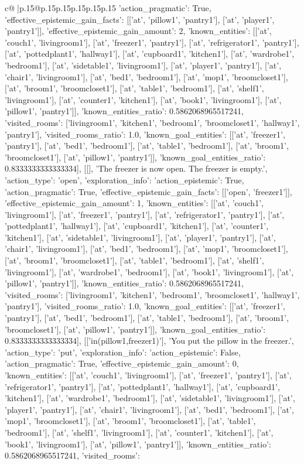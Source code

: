 \documentclass{article}
\begin{document}
{\begin{supertabular}{c@{$\;$}|p{.15\linewidth}@{}p{.15\linewidth}p{.15\linewidth}p{.15\linewidth}p{.15\linewidth}p{.15\linewidth}}
{{{'action_pragmatic': True, 'effective_epistemic_gain_facts': [['at', 'pillow1', 'pantry1'], ['at', 'player1', 'pantry1']], 'effective_epistemic_gain_amount': 2, 'known_entities': [['at', 'couch1', 'livingroom1'], ['at', 'freezer1', 'pantry1'], ['at', 'refrigerator1', 'pantry1'], ['at', 'pottedplant1', 'hallway1'], ['at', 'cupboard1', 'kitchen1'], ['at', 'wardrobe1', 'bedroom1'], ['at', 'sidetable1', 'livingroom1'], ['at', 'player1', 'pantry1'], ['at', 'chair1', 'livingroom1'], ['at', 'bed1', 'bedroom1'], ['at', 'mop1', 'broomcloset1'], ['at', 'broom1', 'broomcloset1'], ['at', 'table1', 'bedroom1'], ['at', 'shelf1', 'livingroom1'], ['at', 'counter1', 'kitchen1'], ['at', 'book1', 'livingroom1'], ['at', 'pillow1', 'pantry1']], 'known_entities_ratio': 0.5862068965517241, 'visited_rooms': ['livingroom1', 'kitchen1', 'bedroom1', 'broomcloset1', 'hallway1', 'pantry1'], 'visited_rooms_ratio': 1.0, 'known_goal_entities': [['at', 'freezer1', 'pantry1'], ['at', 'bed1', 'bedroom1'], ['at', 'table1', 'bedroom1'], ['at', 'broom1', 'broomcloset1'], ['at', 'pillow1', 'pantry1']], 'known_goal_entities_ratio': 0.8333333333333334}}], [[], 'The freezer is now open. The freezer is empty.', {'action_type': 'open', 'exploration_info': {'action_epistemic': True, 'action_pragmatic': True, 'effective_epistemic_gain_facts': [['open', 'freezer1']], 'effective_epistemic_gain_amount': 1, 'known_entities': [['at', 'couch1', 'livingroom1'], ['at', 'freezer1', 'pantry1'], ['at', 'refrigerator1', 'pantry1'], ['at', 'pottedplant1', 'hallway1'], ['at', 'cupboard1', 'kitchen1'], ['at', 'counter1', 'kitchen1'], ['at', 'sidetable1', 'livingroom1'], ['at', 'player1', 'pantry1'], ['at', 'chair1', 'livingroom1'], ['at', 'bed1', 'bedroom1'], ['at', 'mop1', 'broomcloset1'], ['at', 'broom1', 'broomcloset1'], ['at', 'table1', 'bedroom1'], ['at', 'shelf1', 'livingroom1'], ['at', 'wardrobe1', 'bedroom1'], ['at', 'book1', 'livingroom1'], ['at', 'pillow1', 'pantry1']], 'known_entities_ratio': 0.5862068965517241, 'visited_rooms': ['livingroom1', 'kitchen1', 'bedroom1', 'broomcloset1', 'hallway1', 'pantry1'], 'visited_rooms_ratio': 1.0, 'known_goal_entities': [['at', 'freezer1', 'pantry1'], ['at', 'bed1', 'bedroom1'], ['at', 'table1', 'bedroom1'], ['at', 'broom1', 'broomcloset1'], ['at', 'pillow1', 'pantry1']], 'known_goal_entities_ratio': 0.8333333333333334}}], [['in(pillow1,freezer1)'], 'You put the pillow in the freezer.', {'action_type': 'put', 'exploration_info': {'action_epistemic': False, 'action_pragmatic': True, 'effective_epistemic_gain_amount': 0, 'known_entities': [['at', 'couch1', 'livingroom1'], ['at', 'freezer1', 'pantry1'], ['at', 'refrigerator1', 'pantry1'], ['at', 'pottedplant1', 'hallway1'], ['at', 'cupboard1', 'kitchen1'], ['at', 'wardrobe1', 'bedroom1'], ['at', 'sidetable1', 'livingroom1'], ['at', 'player1', 'pantry1'], ['at', 'chair1', 'livingroom1'], ['at', 'bed1', 'bedroom1'], ['at', 'mop1', 'broomcloset1'], ['at', 'broom1', 'broomcloset1'], ['at', 'table1', 'bedroom1'], ['at', 'shelf1', 'livingroom1'], ['at', 'counter1', 'kitchen1'], ['at', 'book1', 'livingroom1'], ['at', 'pillow1', 'pantry1']], 'known_entities_ratio': 0.5862068965517241, 'visited_rooms': }}}
\end{supertabular}}
\end{document}
